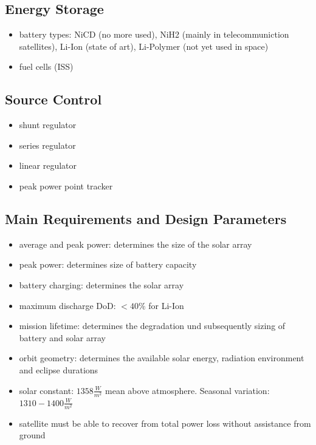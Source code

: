 \subsection{Energy Storage}
 \begin{itemize}
  \item battery types: NiCD (no more used), NiH2 (mainly in telecommuniction satellites), Li-Ion (state of art), Li-Polymer (not yet used in space)
  \item fuel cells (ISS)
 \end{itemize}
\subsection{Source Control}
\begin{itemize}
 \item shunt regulator
 \item series regulator
 \item linear regulator
 \item peak power point tracker
\end{itemize}
\subsection{Main Requirements and Design Parameters}
\begin{itemize}
 \item average and peak power: determines the size of the solar array
 \item peak power: determines size of battery capacity
 \item battery charging: determines the solar array
 \item maximum discharge DoD: $< 40\%$ for Li-Ion
 \item mission lifetime: determines the degradation und subsequently sizing of battery and solar array
 \item orbit geometry: determines the available solar energy, radiation environment and eclipse durations
 \item solar constant: $1358 \frac{W}{m^2}$ mean above atmosphere. Seasonal variation: $1310-1400 \frac{W}{m^2}$
 \item satellite must be able to recover from total power loss without assistance from ground 
\end{itemize}

